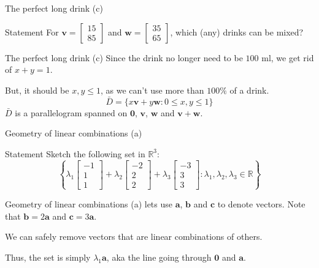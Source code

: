 \documentclass[10pt]{beamer}
\begin{document}
\begin{frame}{The perfect long drink (c)}
    \begin{block}{Statement}
        For $\mathbf{v} = \begin{bmatrix}15 \\ 85\end{bmatrix}$ and $\mathbf{w} = \begin{bmatrix}35\\65\end{bmatrix}$, which (any) drinks can be mixed?
    \end{block}
\end{frame}

\begin{frame}{The perfect long drink (c)}
    Since the drink no longer need to be $100$ ml, we get rid of $x+y=1$.

    But, it should be $x, y \leq 1$, as we can't use more than $100\%$ of a drink.
    $$
    \bar D = \{x \mathbf v + y \mathbf w : 0 \leq x, y \leq 1\}
    $$
    $\bar D$ is a parallelogram spanned on $\mathbf 0$, $\mathbf v$, $\mathbf w$ and $\mathbf v + \mathbf w$.
\end{frame}

\begin{frame}{Geometry of linear combinations (a)}
    \begin{block}{Statement}
        Sketch the following set in $\mathbb R^3$:
        $$\left\{\lambda_1 \begin{bmatrix}-1 \\ 1 \\ 1\end{bmatrix} + \lambda_2 \begin{bmatrix}-2 \\ 2 \\ 2\end{bmatrix} + \lambda_3 \begin{bmatrix}-3 \\ 3 \\ 3\end{bmatrix} : \lambda_1, \lambda_2, \lambda_3 \in \mathbb R\right\}$$
    \end{block}
\end{frame}

\begin{frame}{Geometry of linear combinations (a)}
    lets use $\mathbf a$, $\mathbf b$ and $\mathbf c$ to denote vectors. Note that $\mathbf b = 2 \mathbf a$ and $\mathbf c = 3 \mathbf a$.

    We can safely remove vectors that are linear combinations of others.

    Thus, the set is simply $\lambda_1 \mathbf a$, aka the line going through $\mathbf 0$ and $\mathbf a$.
\end{frame}
\end{document}
